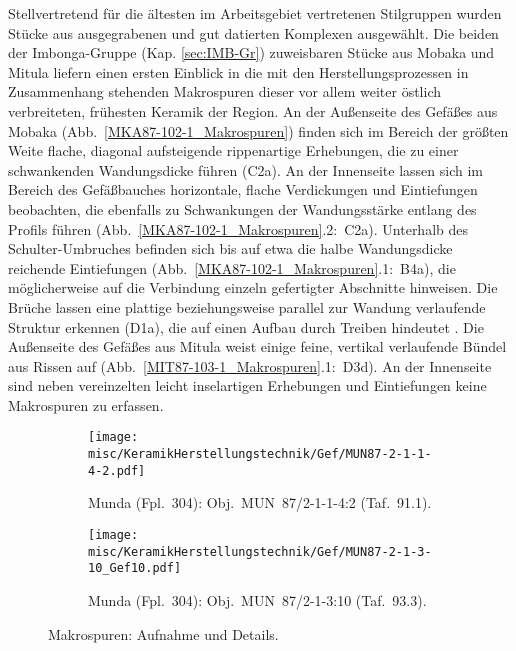 Stellvertretend für die ältesten im Arbeitsgebiet vertretenen Stilgruppen wurden Stücke aus ausgegrabenen und gut datierten Komplexen ausgewählt. Die beiden der Imbonga-Gruppe (Kap. \ref{sec:IMB-Gr}) zuweisbaren Stücke aus Mobaka und Mitula liefern einen ersten Einblick in die mit den Herstellungsprozessen in Zusammenhang stehenden Makrospuren dieser vor allem weiter östlich verbreiteten, frühesten Keramik der Region. An der Außenseite des Gefäßes aus Mobaka (Abb.~\ref{MKA87-102-1_Makrospuren}) finden sich im Bereich der größten Weite flache, diagonal aufsteigende rippenartige Erhebungen, die zu einer schwankenden Wandungsdicke führen (C2a). An der Innenseite lassen sich im Bereich des Gefäßbauches horizontale, flache Verdickungen und Eintiefungen beobachten, die ebenfalls zu Schwankungen der Wandungsstärke entlang des Profils führen (Abb.~\ref{MKA87-102-1_Makrospuren}.2:~C2a). Unterhalb des Schulter-Umbruches befinden sich bis auf etwa die halbe Wandungsdicke reichende Eintiefungen (Abb.~\ref{MKA87-102-1_Makrospuren}.1:~B4a), die möglicherweise auf die Verbindung einzeln gefertigter Abschnitte hinweisen. Die Brüche lassen eine plattige beziehungsweise parallel zur Wandung verlaufende Struktur erkennen (D1a), die auf einen Aufbau durch Treiben hindeutet \parencite[siehe Kap.~\ref{sec:ToepfereiEthnogr};][140 Abb. 8.c--d]{Lindahl.2010}. Die Außenseite des Gefäßes aus Mitula weist einige feine, vertikal verlaufende Bündel aus Rissen auf (Abb.~\ref{MIT87-103-1_Makrospuren}.1:~D3d). An der Innenseite sind neben vereinzelten leicht inselartigen Erhebungen und Eintiefungen keine Makrospuren zu erfassen. 

\begin{figure*}[p]
	\centering
	\begin{subfigure}{\textwidth}
		\centering
		\texttt{[image: misc/KeramikHerstellungstechnik/Gef/MUN87-2-1-1-4-2.pdf]}
		\caption{Munda (Fpl.~304): Obj.~MUN~87/2-1-1-4:2 (Taf.~91.1).\vspace{1em}}
		\label{MUN87-2-1-1-4-2_Makrospuren}
	\end{subfigure}
	\begin{subfigure}{\textwidth}
		\centering
		\texttt{[image: misc/KeramikHerstellungstechnik/Gef/MUN87-2-1-3-10\_Gef10.pdf]}
		\caption{Munda (Fpl.~304): Obj.~MUN~87/2-1-3:10 (Taf.~93.3).}
		\label{MUN87-2-1-3-10_Makrospuren}
	\end{subfigure}
	\caption{Makrospuren: Aufnahme und Details.}
\end{figure*}

